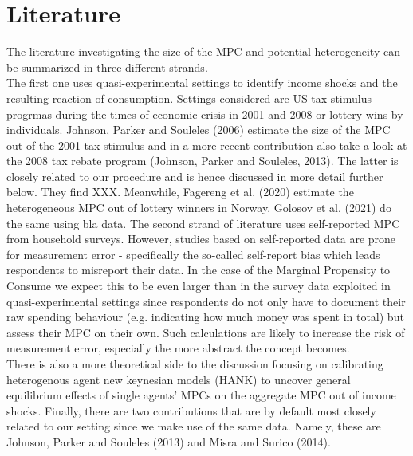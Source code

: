 \section{Literature}
The literature investigating the size of the MPC and potential heterogeneity can be summarized in three different strands. \\
The first one uses quasi-experimental settings to identify income shocks and the resulting reaction of consumption. Settings considered are US tax stimulus progrmas during the times of economic crisis in 2001 and 2008 or lottery wins by individuals. Johnson, Parker and Souleles (2006) estimate the size of the MPC out of the 2001 tax stimulus and in a more recent contribution also take a look at the 2008 tax rebate program (Johnson, Parker and Souleles, 2013). The latter is closely related to our procedure and is hence discussed in more detail further below. They find XXX. Meanwhile, Fagereng et al. (2020) estimate the heterogeneous MPC out of lottery winners in Norway. Golosov et al. (2021) do the same using bla data. 
The second strand of literature uses self-reported MPC from household surveys. 
However, studies based on self-reported data are prone for measurement error - specifically the so-called self-report bias which leads respondents to misreport their data. In the case of the Marginal Propensity to Consume we expect this to be even larger than in the survey data exploited in quasi-experimental settings since respondents do not only have to document their raw spending behaviour (e.g. indicating how much money was spent in total) but assess their MPC on their own. Such calculations are likely to increase the risk of measurement error, especially the more abstract the concept becomes. \\
There is also a more theoretical side to the discussion focusing on calibrating heterogenous agent new keynesian models (HANK) to uncover general equilibrium effects of single agents' MPCs on the aggregate MPC out of income shocks.
Finally, there are two contributions that are by default most closely related to our setting since we make use of the same data. Namely, these are Johnson, Parker and Souleles (2013) and Misra and Surico (2014). 
